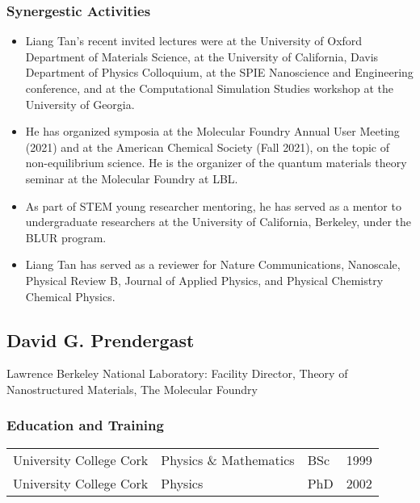 \subsubsection*{Synergestic Activities}
\begin{itemize}
    \item Liang Tan’s recent invited lectures were at the University of Oxford Department of Materials Science, at the University of California, Davis Department of Physics Colloquium, at the SPIE Nanoscience and Engineering conference, and at the Computational Simulation Studies workshop at the University of Georgia. 
    \item He has organized symposia at the Molecular Foundry Annual User Meeting (2021) and at the American Chemical Society (Fall 2021), on the topic of non-equilibrium science. He is the organizer of the quantum materials theory seminar at the Molecular Foundry at LBL. 
    \item As part of STEM young researcher mentoring, he has served as a mentor to undergraduate researchers at the University of California, Berkeley, under the BLUR program. 
    \item Liang Tan has served as a reviewer for Nature Communications, Nanoscale, Physical Review B, Journal of Applied Physics, and Physical Chemistry Chemical Physics.  
\end{itemize}

\clearpage

\subsection*{David G. Prendergast}

Lawrence Berkeley National Laboratory: Facility Director, Theory of Nanostructured Materials, The Molecular Foundry

\subsubsection*{Education and Training}

\begin{table}[ht]
    \centering
    \begin{tabular}{llll}
        University College Cork & Physics \& Mathematics & BSc & 1999 \\
        University College Cork & Physics & PhD & 2002 \\
    \end{tabular}
\end{table}

